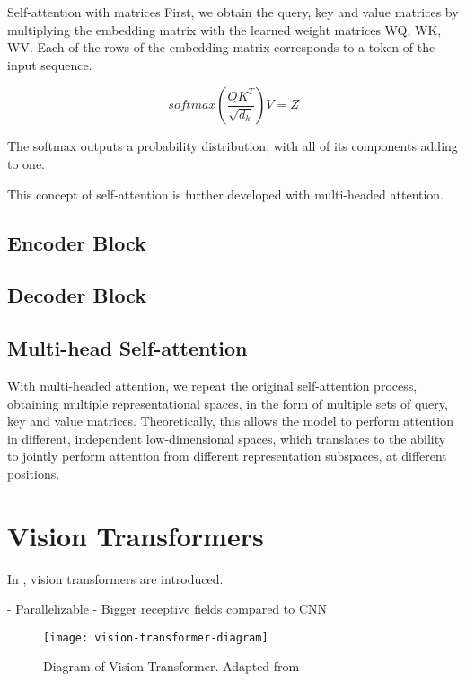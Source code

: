 Self-attention with matrices
First, we obtain the query, key and value matrices by multiplying the embedding matrix with the learned weight matrices WQ, WK, WV.
Each of the rows of the embedding matrix corresponds to a token of the input sequence.

$$softmax(\frac{Q K^T}{\sqrt{d_k}}) V = Z$$

The softmax outputs a probability distribution, with all of its components adding to one.

This concept of self-attention is further developed with multi-headed attention.

\subsection{Encoder Block}
\label{encoder-block}

\subsection{Decoder Block}
\label{decoder-block}

\subsection{Multi-head Self-attention}
\label{multihead-self-attention}

With multi-headed attention, we repeat the original self-attention process, obtaining multiple representational spaces, in the form of 
multiple sets of query, key and value matrices. Theoretically, this allows the model to perform attention in different, independent low-dimensional spaces, which
translates to the ability to jointly perform attention from different representation subspaces, at different positions.

\section{Vision Transformers}
\label{vision-transformers}

In \cite{Dosovitskiy2021-be}, vision transformers are introduced.

- Parallelizable
- Bigger receptive fields compared to CNN

\begin{figure}
    \texttt{[image: vision-transformer-diagram]}
    \caption{Diagram of Vision Transformer. Adapted from }
    \label{fig:vision-transformer-diagram}
\end{figure}

